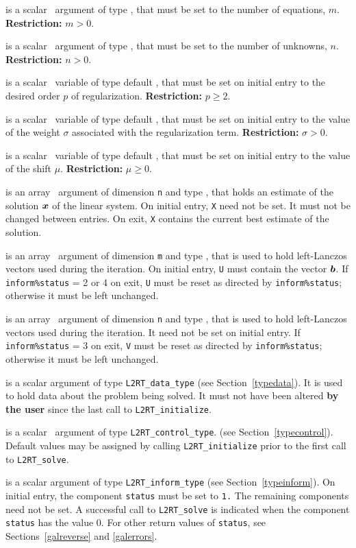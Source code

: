 \documentclass{galahad}
\newcommand{\packagename}{L2\-RT}
\begin{document}
\begin{description}

 is a scalar \intentin\ argument of type \integer, that must be
set to the number of equations, $m$. {\bf Restriction: } $m > 0$.

 is a scalar \intentin\ argument of type \integer, that must be
set to the number of unknowns, $n$. {\bf Restriction: } $n > 0$.

 is a scalar \intentin\ variable of type default
\realdp,
that must be set on initial entry to the desired order $p$ of regularization.
{\bf Restriction: } $p \geq 2$.

 is a scalar \intentin\ variable of type default
\realdp,
that must be set on initial entry
to the value of the weight $\sigma$ associated with the regularization term.
{\bf Restriction: } $\sigma > 0$.

 is a scalar \intentin\ variable of type default
\realdp,
that must be set on initial entry to the value of the shift $\mu$.
{\bf Restriction: } $\mu \geq 0$.

 is an array \intentinout\ argument of dimension {\tt n} and
type \realdp,
that holds an estimate of the solution ${\bm{x}}$ of the linear system.
On initial entry, {\tt X} need not be set.
It must not be changed between entries.
On exit, {\tt X} contains the current best estimate of the solution.

 is an array \intentinout\ argument of dimension {\tt m} and
type \realdp,
that is used to hold left-Lanczos vectors used during the iteration.
On initial entry, {\tt U} must contain the vector ${\bm{b}}$.
If {\tt inform\%status} = 2 or 4 on exit, {\tt U} must be reset
as directed by  {\tt inform\%status}; otherwise
it must be left unchanged.

 is an array \intentinout\ argument of dimension {\tt n} and
type \realdp,
that is used to hold left-Lanczos vectors used during the iteration.
It need not be set on initial entry.
If {\tt inform\%status} = 3 on exit, {\tt V} must be reset
as directed by  {\tt inform\%status}; otherwise it must be left unchanged.

 is a scalar \intentinout argument of type
{\tt \packagename\_data\_type}
(see Section~\ref{typedata}). It is used to hold data about the problem being
solved. It must not have been altered {\bf by the user} since the last call to
{\tt \packagename\_initialize}.

 is a scalar \intentin\ argument of type
{\tt \packagename\_control\_type}.
(see Section~\ref{typecontrol}).
Default values may be assigned by calling {\tt \packagename\_initialize}
prior to the first call to {\tt \packagename\_solve}.

 is a scalar \intentinout argument of type
{\tt \packagename\_inform\_type}
(see Section~\ref{typeinform}).
On initial entry, the component {\tt status} must be set to {\tt 1.}
The remaining components need not be set.
A successful call to
{\tt \packagename\_solve}
is indicated when the  component {\tt status} has the value 0.
For other return values of {\tt status}, see Sections~\ref{galreverse}
and \ref{galerrors}.
\end{description}
\end{document}
